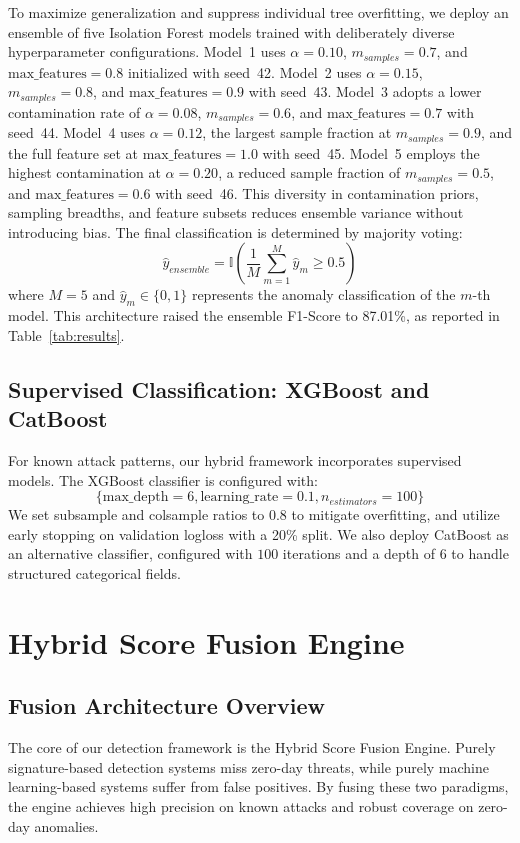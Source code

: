 \documentclass[journal]{IEEEtran}
\begin{document}
To maximize generalization and suppress individual tree
overfitting, we deploy an ensemble of five Isolation Forest
models trained with deliberately diverse hyperparameter
configurations. Model~1 uses $\alpha = 0.10$, $m_{samples} = 0.7$,
and $\text{max\_features} = 0.8$ initialized with seed~42.
Model~2 uses $\alpha = 0.15$, $m_{samples} = 0.8$, and
$\text{max\_features} = 0.9$ with seed~43. Model~3 adopts a
lower contamination rate of $\alpha = 0.08$, $m_{samples} = 0.6$,
and $\text{max\_features} = 0.7$ with seed~44. Model~4 uses
$\alpha = 0.12$, the largest sample fraction at $m_{samples} = 0.9$,
and the full feature set at $\text{max\_features} = 1.0$ with seed~45.
Model~5 employs the highest contamination at $\alpha = 0.20$,
a reduced sample fraction of $m_{samples} = 0.5$, and
$\text{max\_features} = 0.6$ with seed~46. This diversity in
contamination priors, sampling breadths, and feature subsets
reduces ensemble variance without introducing bias. The
final classification is determined by majority voting:
\begin{equation}
  \hat{y}_{ensemble} = \mathbb{I}\!\left(\frac{1}{M}
    \sum_{m=1}^{M} \hat{y}_m \geq 0.5\right)
\end{equation}
where $M = 5$ and $\hat{y}_m \in \{0, 1\}$ represents the
anomaly classification of the $m$-th model. This architecture
raised the ensemble F1-Score to 87.01\%, as reported in
Table~\ref{tab:results}.

\subsection{Supervised Classification: XGBoost and CatBoost}
For known attack patterns, our hybrid framework incorporates supervised models. The XGBoost classifier is configured with:
$$\{\text{max\_depth} = 6, \text{learning\_rate} = 0.1, n_{estimators} = 100\}$$
We set subsample and colsample ratios to $0.8$ to mitigate overfitting, and utilize early stopping on validation logloss with a 20\% split. We also deploy CatBoost as an alternative classifier, configured with $100$ iterations and a depth of $6$ to handle structured categorical fields.

\section{Hybrid Score Fusion Engine}

\subsection{Fusion Architecture Overview}
The core of our detection framework is the Hybrid Score Fusion Engine. Purely signature-based detection systems miss zero-day threats, while purely machine learning-based systems suffer from false positives. By fusing these two paradigms, the engine achieves high precision on known attacks and robust coverage on zero-day anomalies.
\end{document}
